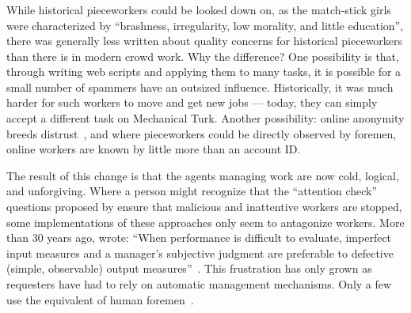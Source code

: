 \documentclass[trackingWork]{subfiles}
\begin{document}
\onlyinsubfile{\clearpage}
\subsubsection{\whatchanged}

\begin{comment}
	*workers make little money but love autonomy --- workers make little money
	workers blamed for quality --- ???
	both cases, sociality is hard
	*collective action hard --- collective action succeeded
	- algorithms, not managers
\end{comment}

While historical pieceworkers could be looked down on, as the match-stick girls were characterized by ``brashness, irregularity, low morality, and little education'', there was generally less written about quality concerns for historical pieceworkers than there is in modern crowd work. 
Why the difference? 
One possibility is that, through writing web scripts and applying them to many tasks, it is possible for a small number of spammers have an outsized influence.
Historically, it was much harder for such workers to move and get new jobs --- today, they can simply accept a different task on Mechanical Turk.
Another possibility: online anonymity breeds distrust~\cite{friedman2000trust}, and where pieceworkers could be directly observed by foremen, online workers are known by little more than an account ID.



The result of this change is that the agents managing work are now
cold, logical, and unforgiving.
Where a person might recognize that the ``attention check'' questions 
proposed by \citeauthor{le2010ensuring} ensure that malicious and inattentive workers are stopped,
some implementations of these approaches
only seem to antagonize workers.
More than 30 years ago, \citeauthor{10.2307/2555446} wrote:
``When performance is difficult to evaluate,
imperfect input measures and
a manager's subjective judgment are preferable to
defective (simple, observable) output measures''~\cite{10.2307/2555446}.
This frustration has only grown as requesters have had to rely on automatic management mechanisms. Only a few use the equivalent of human foremen~\cite{haas2015argonaut,kulkarni2012mobileworks}.
\end{document}
